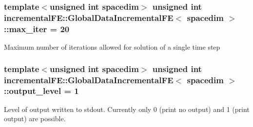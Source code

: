 \subsubsection[{\texorpdfstring{max\+\_\+iter}{max_iter}}]{\setlength{\rightskip}{0pt plus 5cm}template$<$unsigned int spacedim$>$ unsigned int {\bf incremental\+F\+E\+::\+Global\+Data\+Incremental\+FE}$<$ spacedim $>$\+::max\+\_\+iter = 20\hspace{0.3cm}{\ttfamily [private]}}\hypertarget{classincremental_f_e_1_1_global_data_incremental_f_e_ad15c334652b6a9d6843c360c6e2005ec}{}\label{classincremental_f_e_1_1_global_data_incremental_f_e_ad15c334652b6a9d6843c360c6e2005ec}
Maximum number of iterations allowed for solution of a single time step 
\subsubsection[{\texorpdfstring{output\+\_\+level}{output_level}}]{\setlength{\rightskip}{0pt plus 5cm}template$<$unsigned int spacedim$>$ unsigned int {\bf incremental\+F\+E\+::\+Global\+Data\+Incremental\+FE}$<$ spacedim $>$\+::output\+\_\+level = 1\hspace{0.3cm}{\ttfamily [private]}}\hypertarget{classincremental_f_e_1_1_global_data_incremental_f_e_a0d5cf3ecf70ec61771bbcfe45d0e6b5d}{}\label{classincremental_f_e_1_1_global_data_incremental_f_e_a0d5cf3ecf70ec61771bbcfe45d0e6b5d}
Level of output written to stdout. Currently only 0 (print no output) and 1 (print output) are possible. 
